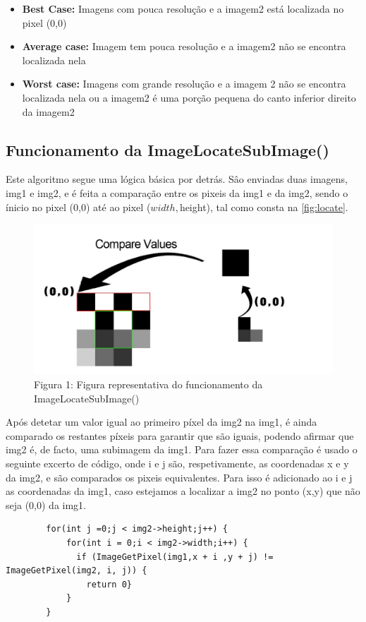 \newpage 

\begin{itemize}
    \item \textbf{Best Case:} Imagens com pouca resolução e a imagem2 está localizada no pixel (0,0)
    \item \textbf{Average case:} Imagem tem pouca resolução e a imagem2 não se encontra localizada nela
    \item \textbf{Worst case:} Imagens com grande resolução e a imagem 2 não se encontra localizada nela
        ou a imagem2 é uma porção pequena do canto inferior direito da imagem2
\end{itemize}

\subsection{Funcionamento da ImageLocateSubImage()}
    \par Este algoritmo segue uma lógica básica por detrás. Sâo enviadas duas imagens, img1 e img2, e é feita 
        a comparação entre os pixeis da img1 e da img2, sendo o ínicio no pixel (0,0) até ao pixel ($width,$height),
        tal como consta na \autoref{fig:locate}.

    \begin{figure} [H]
        \centering
        \includegraphics[scale=0.25]{images/Locate_Function.pdf}
        \caption{Figura 1: Figura representativa do funcionamento da ImageLocateSubImage()}
        \label{fig:locate}
    \end{figure}

    \par Após detetar um valor igual ao primeiro píxel da img2 na img1, é ainda comparado os restantes píxeis para 
        garantir que são iguais, podendo afirmar que img2 é, de facto, uma subimagem da img1. Para fazer essa 
        comparação é usado o seguinte excerto de código, onde i e j são, respetivamente, as coordenadas x e y da 
        img2, e são comparados os pixeis equivalentes. Para isso é adicionado ao i e j as coordenadas da img1, caso
        estejamos a localizar a img2 no ponto (x,y) que não seja (0,0) da img1.

    \begin{lstlisting}
        for(int j =0;j < img2->height;j++) {
            for(int i = 0;i < img2->width;i++) {
              if (ImageGetPixel(img1,x + i ,y + j) != ImageGetPixel(img2, i, j)) {
                return 0}
            }
        }
    \end{lstlisting}
